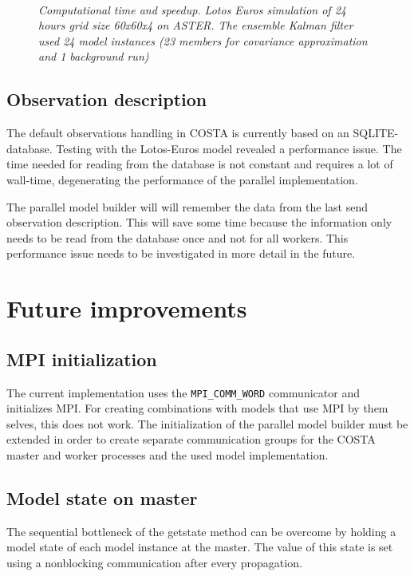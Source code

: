 \begin{figure}
\hbox{
      }

\caption{\em Computational time and speedup. Lotos Euros simulation of 24 
             hours grid size 60x60x4 on ASTER. The ensemble Kalman filter
             used 24 model instances (23 members for covariance approximation
             and 1 background run)}
\label{Fig:vier}
\end{figure}

\subsection{Observation description}
The default observations handling in COSTA is currently based on an
SQLITE-database. Testing with the Lotos-Euros model revealed a performance
issue. The time needed for reading from the database is not constant and
requires a lot of wall-time, degenerating the performance of the parallel
implementation. 

The parallel model builder will will remember the data from the last send
observation description. This will save some time because the information
only needs to be read from the database once and not for all workers.
This performance issue needs to be investigated in more detail in the
future.



\section{Future improvements} \label{Sec:Future improvements}
\subsection{MPI initialization}
The current implementation uses the {\tt MPI\_COMM\_WORD} communicator and
initializes MPI. For creating combinations with models that use MPI by them
selves, this does not work. The initialization of the parallel model
builder must be extended in order to create separate communication groups
for the COSTA master and worker processes and the used model
implementation.

\subsection{Model state on master}
The sequential bottleneck of the getstate method can be overcome by holding
a model state of each model instance at the master. The value of this state
is set using a nonblocking communication after every propagation.

